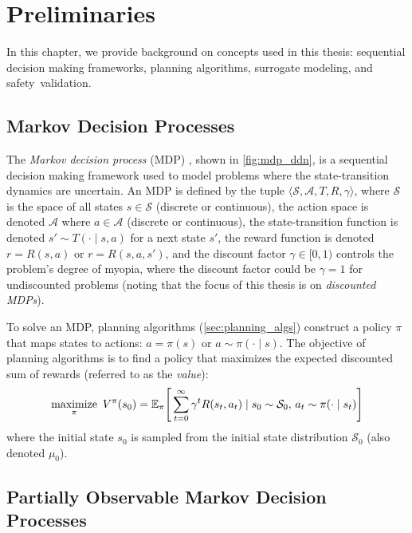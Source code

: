 \chapter{Preliminaries}\label{ch:preliminaries}
\vspace*{-6mm}

In this chapter, we provide background on concepts used in this thesis: sequential decision making frameworks, planning algorithms, surrogate modeling, and safety~validation.

\section{Markov Decision Processes}
The \textit{Markov decision process} (MDP) \cite{bellman1957dynamic,dmbook}, shown in \cref{fig:mdp_ddn}, is a sequential decision making framework used to model problems where the state-transition dynamics are uncertain.
An MDP is defined by the tuple $\langle \mathcal{S}, \mathcal{A}, T, R, \gamma \rangle$, where $\mathcal{S}$ is the space of all states $s \in \mathcal{S}$ (discrete or continuous), the action space is denoted $\mathcal{A}$ where $a \in \mathcal{A}$ (discrete or continuous), the state-transition function is denoted $s' \sim T(\cdot \mid s, a)$ for a next state $s'$, the reward function is denoted $r = R(s,a)$ or $r = R(s,a,s')$, and the discount factor $\gamma \in [0, 1)$ controls the problem's degree of myopia, where the discount factor could be $\gamma = 1$ for undiscounted problems (noting that the focus of this thesis is on \textit{discounted MDPs}).

To solve an MDP, planning algorithms (\cref{sec:planning_algs}) construct a policy $\pi$ that maps states to actions: $a = \pi(s)$ or $a \sim \pi(\cdot \mid s)$.
The objective of planning algorithms is to find a policy that maximizes the expected discounted sum of rewards (referred to as the \textit{value}):
\begin{equation}
    \operatornamewithlimits{maximize}_\pi \,\, V^\pi(s_0) = \mathbb{E}_\pi \Bigg[ \sum_{t=0}^\infty \gamma^t R(s_t, a_t) \mid s_0 \sim \mathcal{S}_0,\, a_t \sim \pi(\cdot \mid s_t) \Bigg]
\end{equation}
where the initial state $s_0$ is sampled from the initial state distribution $\mathcal{S}_0$ (also denoted $\mu_0$).



\section{Partially Observable Markov Decision Processes}\label{sec:pomdps}

